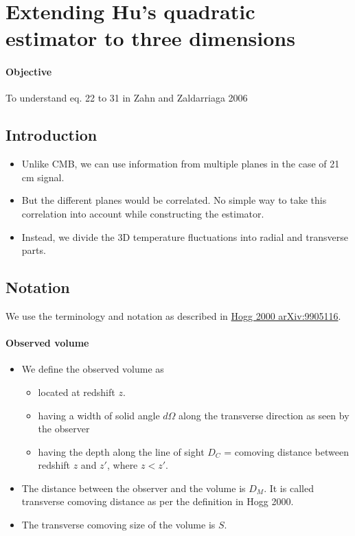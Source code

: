\documentclass[12pt]{article}
\numberwithin{equation}{section}
\begin{document}
\tableofcontents
\pagebreak

\section{Extending Hu's quadratic estimator to three dimensions}
\paragraph{Objective} To understand eq. 22 to 31 in Zahn and Zaldarriaga 2006

\subsection{Introduction}
\begin{itemize}
	\item Unlike CMB, we can use information from multiple planes in the case of 21 cm signal.
	\item But the different planes would be correlated. No simple way to take this correlation into account while constructing the estimator.
	\item Instead, we divide the 3D temperature fluctuations into radial and transverse parts.
\end{itemize}

\subsection{Notation}
We use the terminology and notation as described in \href{http://arxiv.org/abs/astro-ph/9905116v4}{Hogg 2000 arXiv:9905116}.
\paragraph{Observed volume}
\begin{itemize}
	\item We define the observed volume as
		\begin{itemize}
			\item located at redshift $ z $. 
			\item having a width of solid angle $ d\Omega $ along the transverse direction as seen by the observer
			\item having the depth along the line of sight $ D_C $ = comoving distance between redshift $ z$ and $ z' $, where $ z < z' $.
		\end{itemize}
	\item The  distance between the observer and the volume is $ D_M $. It is called transverse comoving distance as per the definition in Hogg 2000.
	\item The transverse comoving size of the volume is $ S $. 
\end{itemize}
\end{document}
